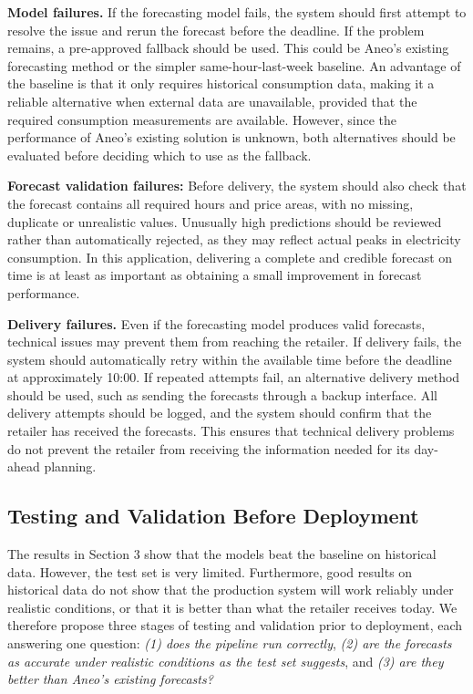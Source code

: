 \documentclass[11pt,a4paper]{article}
\begin{document}
\textbf{Model failures.} If the forecasting model fails, the system should first attempt to resolve the issue and rerun the forecast before the deadline. If the problem remains, a pre-approved fallback should be used. This could be Aneo's existing forecasting method or the simpler same-hour-last-week baseline. An advantage of the baseline is that it only requires historical consumption data, making it a reliable alternative when external data are unavailable, provided that the required consumption measurements are available. However, since the performance of Aneo's existing solution is unknown, both alternatives should be evaluated before deciding which to use as the fallback. 

\textbf{Forecast validation failures:} Before delivery, the system should also check that the forecast contains all required hours and price areas, with no missing, duplicate or unrealistic values. Unusually high predictions should be reviewed rather than automatically rejected, as they may reflect actual peaks in electricity consumption. In this application, delivering a complete and credible forecast on time is at least as important as obtaining a small improvement in forecast performance.

\textbf{Delivery failures.} Even if the forecasting model produces valid forecasts, technical issues may prevent them from reaching the retailer. If delivery fails, the system should automatically retry within the available time before the deadline at approximately 10:00. If repeated attempts fail, an alternative delivery method should be used, such as sending the forecasts through a backup interface. All delivery attempts should be logged, and the system should confirm that the retailer has received the forecasts. This ensures that technical delivery problems do not prevent the retailer from receiving the information needed for its day-ahead planning.

\subsection{Testing and Validation Before Deployment}

The results in Section 3 show that the models beat the baseline on historical data. However, the test set is very limited. Furthermore, good results on historical data do not show that the production system will work reliably under realistic conditions, or that it is better than what the retailer receives today. We therefore propose three stages of testing and validation prior to deployment, each answering one question: \textit{(1) does the pipeline run correctly}, \textit{(2) are the forecasts as accurate under realistic conditions as the test set suggests}, and \textit{(3) are they better than Aneo's existing forecasts?}
\end{document}
